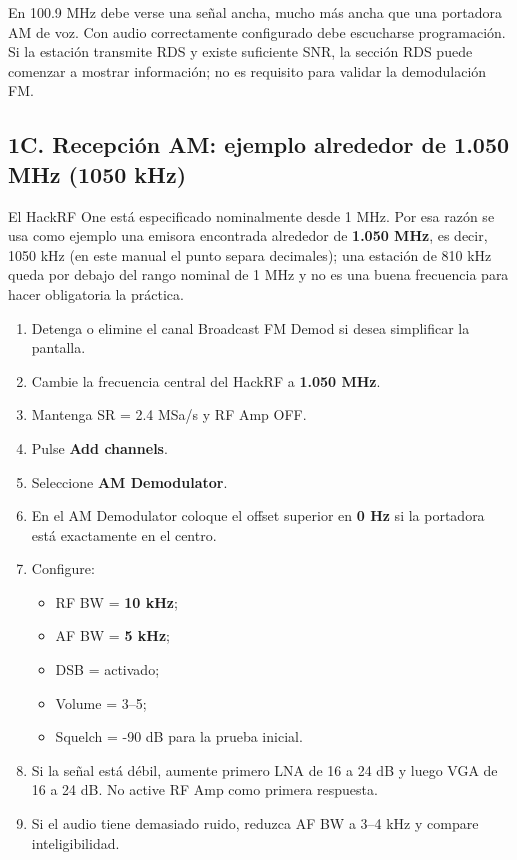 \begin{esperado}
En 100.9 MHz debe verse una señal ancha, mucho más ancha que una portadora AM de voz. Con audio correctamente configurado debe escucharse programación. Si la estación transmite RDS y existe suficiente SNR, la sección RDS puede comenzar a mostrar información; no es requisito para validar la demodulación FM.
\end{esperado}

\subsection{1C. Recepción AM: ejemplo alrededor de 1.050 MHz (1050 kHz)}

El HackRF One está especificado nominalmente desde 1 MHz. Por esa razón se usa como ejemplo una emisora encontrada alrededor de \textbf{1.050 MHz}, es decir, 1050 kHz (en este manual el punto separa decimales); una estación de 810 kHz queda por debajo del rango nominal de 1 MHz y no es una buena frecuencia para hacer obligatoria la práctica.

\begin{enumerate}
    \item Detenga o elimine el canal Broadcast FM Demod si desea simplificar la pantalla.
    \item Cambie la frecuencia central del HackRF a \textbf{1.050 MHz}.
    \item Mantenga SR = 2.4 MSa/s y RF Amp OFF.
    \item Pulse \textbf{Add channels}.
    \item Seleccione \textbf{AM Demodulator}.
    \item En el AM Demodulator coloque el offset superior en \textbf{0 Hz} si la portadora está exactamente en el centro.
    \item Configure:
    \begin{itemize}
        \item RF BW = \textbf{10 kHz};
        \item AF BW = \textbf{5 kHz};
        \item DSB = activado;
        \item Volume = 3--5;
        \item Squelch = -90 dB para la prueba inicial.
    \end{itemize}
    \item Si la señal está débil, aumente primero LNA de 16 a 24 dB y luego VGA de 16 a 24 dB. No active RF Amp como primera respuesta.
    \item Si el audio tiene demasiado ruido, reduzca AF BW a 3--4 kHz y compare inteligibilidad.
\end{enumerate}

